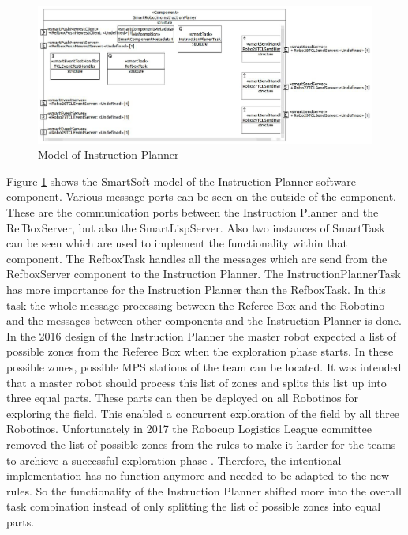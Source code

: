 \begin{figure}[h]
\centering
\includegraphics[scale=0.25]{pic/SmartRobotinoInstructionPlaner.JPG}
\caption{Model of Instruction Planner}
\label{fig:i_overview}
\end{figure}


Figure \ref{fig:i_overview} shows the SmartSoft model of the Instruction Planner software component. Various message ports can be seen on the outside of the component. These are the communication ports between the Instruction Planner and the RefBoxServer, but also the SmartLispServer. Also two instances of SmartTask can be seen which are used to implement the functionality within that component. The RefboxTask handles all the messages which are send from the RefboxServer component to the Instruction Planner. The InstructionPlannerTask has more importance for the Instruction Planner than the RefboxTask. In this task the whole message processing between the Referee Box and the Robotino and the messages between other components and the Instruction Planner is done. \\


In the 2016 design of the Instruction Planner the master robot expected a list of possible zones from the Referee Box when the exploration phase starts. In these possible zones, possible MPS stations of the team can be located. It was intended that a master robot should process this list of zones and splits this list up into three equal parts. These parts can then be deployed on all Robotinos for exploring the field. This enabled a concurrent exploration of the field by all three Robotinos.  Unfortunately in 2017 the Robocup Logistics League committee removed the list of possible zones from the rules to make it harder for the teams to archieve a successful exploration phase \cite{RC17}. Therefore, the intentional implementation has no function anymore and needed to be adapted to the new rules. So the functionality of the Instruction Planner shifted more into the overall task combination instead of only splitting the list of possible zones into equal parts. \\



